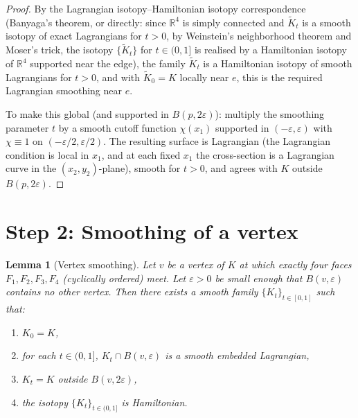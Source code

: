 \documentclass[12pt]{article}
\newtheorem{lemma}[theorem]{Lemma}
\theoremstyle{definition}
\begin{document}
\begin{proof}
By the Lagrangian isotopy--Hamiltonian isotopy correspondence (Banyaga's theorem, or directly: since $\mathbb{R}^4$ is simply connected and $\tilde{K}_t$ is a smooth isotopy of exact Lagrangians for $t > 0$, by Weinstein's neighborhood theorem and Moser's trick, the isotopy $\{\tilde{K}_t\}$ for $t \in (0,1]$ is realised by a Hamiltonian isotopy of $\mathbb{R}^4$ supported near the edge), the family $\tilde{K}_t$ is a Hamiltonian isotopy of smooth Lagrangians for $t > 0$, and with $\tilde{K}_0 = K$ locally near $e$, this is the required Lagrangian smoothing near $e$.

To make this global (and supported in $B(p,2\varepsilon)$): multiply the smoothing parameter $t$ by a smooth cutoff function $\chi(x_1)$ supported in $(-\varepsilon, \varepsilon)$ with $\chi \equiv 1$ on $(-\varepsilon/2, \varepsilon/2)$. The resulting surface is Lagrangian (the Lagrangian condition is local in $x_1$, and at each fixed $x_1$ the cross-section is a Lagrangian curve in the $(x_2,y_2)$-plane), smooth for $t > 0$, and agrees with $K$ outside $B(p, 2\varepsilon)$.
\end{proof}

\section*{Step 2: Smoothing of a vertex}

\begin{lemma}[Vertex smoothing]
\label{lem:vertex}
Let $v$ be a vertex of $K$ at which exactly four faces $F_1, F_2, F_3, F_4$ (cyclically ordered) meet. Let $\varepsilon > 0$ be small enough that $B(v,\varepsilon)$ contains no other vertex. Then there exists a smooth family $\{K_t\}_{t \in [0,1]}$ such that:
\begin{enumerate}
  \item[(a)] $K_0 = K$,
  \item[(b)] for each $t \in (0,1]$, $K_t \cap B(v, \varepsilon)$ is a smooth embedded Lagrangian,
  \item[(c)] $K_t = K$ outside $B(v,2\varepsilon)$,
  \item[(d)] the isotopy $\{K_t\}_{t \in (0,1]}$ is Hamiltonian.
\end{enumerate}
\end{lemma}
\end{document}
